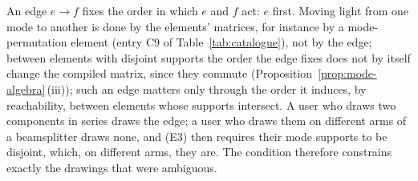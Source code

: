 
\begin{remark}\label{rem:edgemeaning}
An edge $e\to f$ fixes the order in which $e$ and $f$ act: $e$ first. Moving
light from one mode to another is done by the elements' matrices, for
instance by a mode-permutation element (entry C9 of
Table~\ref{tab:catalogue}), not by the edge; between elements with disjoint
supports the order the edge fixes does not by itself change the compiled
matrix, since they commute (Proposition~\ref{prop:mode-algebra}\,(iii)); such
an edge matters only through the order it induces, by reachability, between
elements whose supports intersect. A user who
draws two components in series draws the edge; a user who draws them on
different arms of a beamsplitter draws none, and (E3) then requires their mode
supports to be disjoint, which, on different arms, they are. The condition
therefore constrains exactly the drawings that were ambiguous.
\end{remark}
